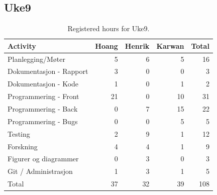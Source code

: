 \subsection{Uke9}

\begin{table}[H]
\centering
\small
\caption{Registered hours for Uke9.}
\label{tab:project-hours-uke9}
\begin{tabular}{lrrrr}
\toprule
Activity & Hoang & Henrik & Karwan & Total \\
\midrule
Planlegging/Møter & 5 & 6 & 5 & 16 \\
Dokumentasjon - Rapport & 3 & 0 & 0 & 3 \\
Dokumentasjon - Kode & 1 & 0 & 1 & 2 \\
Programmering - Front & 21 & 0 & 10 & 31 \\
Programmering - Back & 0 & 7 & 15 & 22 \\
Programmering - Bugs & 0 & 0 & 5 & 5 \\
Testing & 2 & 9 & 1 & 12 \\
Forskning & 4 & 4 & 1 & 9 \\
Figurer og diagrammer & 0 & 3 & 0 & 3 \\
Git / Administrasjon & 1 & 3 & 1 & 5 \\
\midrule
Total & 37 & 32 & 39 & 108 \\
\bottomrule
\end{tabular}
\end{table}

